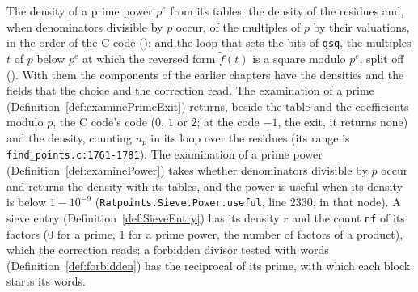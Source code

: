 \begin{definition}\label{def:densities}
  \leanok
  The density of a prime power $p^e$ from its tables: the density of the residues and, when
  denominators divisible by $p$ occur, of the multiples of $p$ by their valuations, in the order of
  the C code (); and the loop that sets the bits of \verb|gsq|,
  the multiples $t$ of $p$ below $p^e$ at which the reversed form $\tilde f(t)$ is a square modulo
  $p^e$, split off (). With them the components of the earlier
  chapters have the densities and the fields that the choice and the correction read. The
  examination of a prime (Definition~\ref{def:examinePrimeExit}) returns, beside the table and the
  coefficients modulo $p$, the C code's code ($0$, $1$ or $2$; at the code $-1$, the exit, it
  returns none) and the density, counting $n_p$ in its loop over the residues (its range is
  \verb|find_points.c:1761-1781|). The examination of a prime power
  (Definition~\ref{def:examinePower}) takes whether denominators divisible by $p$ occur and returns
  the density with its tables, and the power is useful when its density is below $1 - 10^{-9}$
  (\verb|Ratpoints.Sieve.Power.useful|, line 2330, in that node). A sieve entry
  (Definition~\ref{def:SieveEntry}) has its density $r$ and the count \verb|nf| of its factors ($0$
  for a prime, $1$ for a prime power, the number of factors of a product), which the correction
  reads; a forbidden divisor tested with words (Definition~\ref{def:forbidden}) has the reciprocal
  of its prime, with which each block starts its words.
\end{definition}

